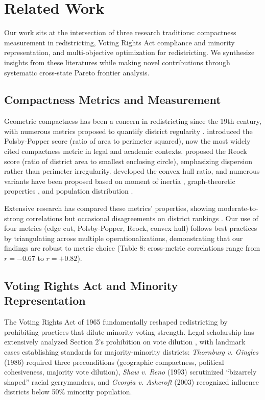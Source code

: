 
\section{Related Work}

Our work sits at the intersection of three research traditions: compactness measurement in redistricting, Voting Rights Act compliance and minority representation, and multi-objective optimization for redistricting. We synthesize insights from these literatures while making novel contributions through systematic cross-state Pareto frontier analysis.

\subsection{Compactness Metrics and Measurement}

Geometric compactness has been a concern in redistricting since the 19th century, with numerous metrics proposed to quantify district regularity \citep{young1988}. \citet{polsby1991} introduced the Polsby-Popper score (ratio of area to perimeter squared), now the most widely cited compactness metric in legal and academic contexts. \citet{reock1961} proposed the Reock score (ratio of district area to smallest enclosing circle), emphasizing dispersion rather than perimeter irregularity. \citet{schwartzberg1966} developed the convex hull ratio, and numerous variants have been proposed based on moment of inertia \citep{altman1998}, graph-theoretic properties \citep{barnes2001}, and population distribution \citep{fryer2005}.

Extensive research has compared these metrics' properties, showing moderate-to-strong correlations but occasional disagreements on district rankings \citep{altman1998,barnes2001}. Our use of four metrics (edge cut, Polsby-Popper, Reock, convex hull) follows best practices by triangulating across multiple operationalizations, demonstrating that our findings are robust to metric choice (Table 8: cross-metric correlations range from $r = -0.67$ to $r = +0.82$).

\subsection{Voting Rights Act and Minority Representation}

The Voting Rights Act of 1965 fundamentally reshaped redistricting by prohibiting practices that dilute minority voting strength. Legal scholarship has extensively analyzed Section 2's prohibition on vote dilution \citep{issacharoff2002,pildes1993}, with landmark cases establishing standards for majority-minority districts: \emph{Thornburg v. Gingles} (1986) required three preconditions (geographic compactness, political cohesiveness, majority vote dilution), \emph{Shaw v. Reno} (1993) scrutinized ``bizarrely shaped'' racial gerrymanders, and \emph{Georgia v. Ashcroft} (2003) recognized influence districts below 50\% minority population.

